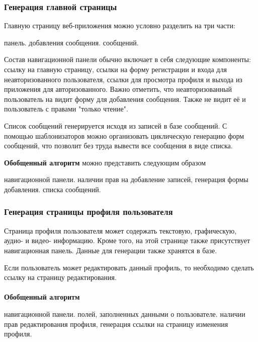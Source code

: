 \documentclass[a4paper]{article}
\begin{document}
\subsubsection{Генерация главной страницы}

Главную страницу веб-приложения можно условно разделить на три части:
\begin{itemize}
 панель.
 добавления сообщения.
 сообщений.
\end{itemize}

Состав навигационной панели обычно включает в себя следующие компоненты: ссылку на главную страницу, ссылки на форму регистрации и входа для неавторизованного пользователя, ссылки для просмотра профиля и выхода из приложения для авторизованного. Важно отметить, что неавторизованный пользователь на видит форму для добавления сообщения. Также не видит её и пользователь с правами "только чтение".

Список сообщений генерируется исходя из записей в базе сообщений. С помощью шаблонизаторов можно организовать циклическую генерацию форм сообщений, что позволит без труда вывести все сообщения в виде списка.

\textbf{Обобщенный алгоритм} можно представить следующим образом

\begin{enumerate}
 навигационной панели.
 наличии прав на добавление записей, генерация формы добавления.
 списка сообщений.
\end{enumerate}

\subsubsection{Генерация страницы профиля пользователя}

Страница профиля пользователя может содержать текстовую, графическую, аудио- и видео- информацию. Кроме того, на этой странице также присутствует навигационная панель. Данные для генерации также хранятся в базе.

Если пользователь может редактировать данный профиль, то необходимо сделать ссылку на страницу редактирования.\\\\

\textbf{Обобщенный алгоритм}

\begin{enumerate}
 навигационной панели.
 полей, заполненных данными о пользователе.
 наличии прав редактирования профиля, генерация ссылки на страницу изменения профиля.
\end{enumerate}
\end{document}
